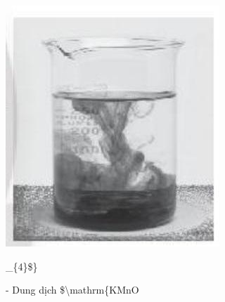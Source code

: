 \documentclass[10pt]{article}
\begin{document}
\begin{figure}[h]
\begin{center}
  \includegraphics[width=\textwidth]{2025_10_23_883c4b146e2332109fcdg-40}
\captionsetup{labelformat=empty}
\caption{- Dung dịch \$\textbackslash mathrm\{KMnO}\_\{4\}\$\}\end{center}
\end{figure}
\end{document}
